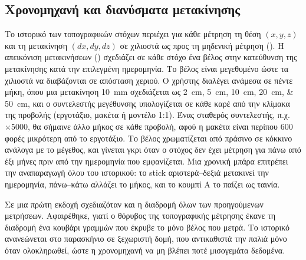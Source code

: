 \subsection{Χρονομηχανή και διανύσματα μετακίνησης}
Το ιστορικό των τοπογραφικών στόχων περιέχει για κάθε μέτρηση τη θέση $(x, y, z)$ και τη μετακίνηση $(dx, dy, dz)$ σε χιλιοστά ως προς τη μηδενική μέτρηση (). Η απεικόνιση μετακινήσεων () σχεδιάζει σε κάθε στόχο ένα βέλος στην κατεύθυνση της μετακίνησης κατά την επιλεγμένη ημερομηνία. Το βέλος είναι μεγεθυμένο ώστε τα χιλιοστά να διαβάζονται σε απόσταση χεριού. Ο χρήστης διαλέγει ανάμεσα σε πέντε μήκη, όπου μια μετακίνηση \SI{10}{mm} σχεδιάζεται ως \SIlist{2;5;10;20;50}{cm}, και ο συντελεστής μεγέθυνσης υπολογίζεται σε κάθε καρέ από την κλίμακα της προβολής (εργοτάξιο, μακέτα ή μοντέλο 1:1). Ένας σταθερός συντελεστής, π.χ. ×5000, θα σήμαινε άλλο μήκος σε κάθε προβολή, αφού η μακέτα είναι περίπου 600 φορές μικρότερη από το εργοτάξιο. Το βέλος χρωματίζεται από πράσινο σε κόκκινο ανάλογα με το μέγεθος, και γίνεται γκρι όταν ο στόχος δεν έχει μέτρηση για πάνω από έξι μήνες πριν από την ημερομηνία που εμφανίζεται. Μια χρονική μπάρα επιτρέπει την αναπαραγωγή όλου του ιστορικού: το stick αριστερά–δεξιά μετακινεί την ημερομηνία, πάνω–κάτω αλλάζει το μήκος, και το κουμπί A το παίζει ως ταινία.

Σε μια πρώτη εκδοχή σχεδιαζόταν και η διαδρομή όλων των προηγούμενων μετρήσεων. Αφαιρέθηκε, γιατί ο θόρυβος της τοπογραφικής μέτρησης έκανε τη διαδρομή ένα κουβάρι γραμμών που έκρυβε το μόνο βέλος που μετρά. Το ιστορικό ανανεώνεται στο παρασκήνιο σε ξεχωριστή δομή, που αντικαθιστά την παλιά μόνο όταν ολοκληρωθεί, ώστε η χρονομηχανή να μη βλέπει ποτέ μισογεμάτα δεδομένα.

